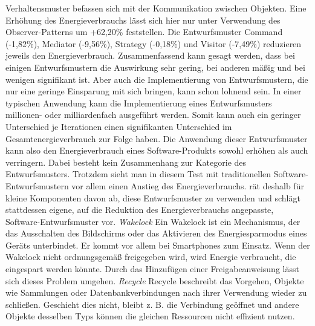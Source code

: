 \documentclass[utf8,biblatex]{lni}
\begin{document}
\newline
Verhaltensmuster befassen sich mit der Kommunikation zwischen Objekten. Eine Erhöhung des Energieverbrauchs lässt sich hier nur unter Verwendung des Observer-Patterns um +62,20\% feststellen. Die Entwurfsmuster Command (-1,82\%), Mediator (-9,56\%), Strategy (-0,18\%) und Visitor (-7,49\%) reduzieren jeweils den Energieverbrauch.
\newline
Zusammenfassend kann gesagt werden, dass bei einigen Entwurfsmustern die Auswirkung sehr gering, bei anderen mäßig und bei wenigen signifikant ist. Aber auch die Implementierung von Entwurfsmustern, die nur eine geringe Einsparung mit sich bringen, kann schon lohnend sein. In einer typischen Anwendung kann die Implementierung eines Entwurfsmusters millionen- oder milliardenfach ausgeführt werden. Somit kann auch ein geringer Unterschied je Iterationen einen signifikanten Unterschied im Gesamtenergieverbrauch zur Folge haben.
Die Anwendung dieser Entwurfsmuster kann also den Energieverbrauch eines Software-Produkts sowohl erhöhen als auch verringern. Dabei besteht kein Zusammenhang zur Kategorie des Entwurfsmusters. \cite{Sahin12}
\newline
\newline
Trotzdem sieht man in diesem Test mit traditionellen Software-Entwurfsmustern vor allem einen Anstieg des Energieverbrauchs. \cite{Calero21} rät deshalb für kleine Komponenten davon ab, diese Entwurfsmuster zu verwenden und schlägt stattdessen eigene, auf die Reduktion des Energieverbrauchs angepasste, Software-Entwurfsmuster vor.
\newline \newline \textit{Wakelock} \newline
Ein Wakelock ist ein Mechanismus, der das Ausschalten des Bildschirms oder das Aktivieren des Energiesparmodus eines Geräts unterbindet. Er kommt vor allem bei Smartphones zum Einsatz. Wenn der Wakelock nicht ordnungsgemäß freigegeben wird, wird Energie verbraucht, die eingespart werden könnte. Durch das Hinzufügen einer Freigabeanweisung lässt sich dieses Problem umgehen. \cite{Calero21}
\newline \newline \textit{Recycle} \newline
Recycle beschreibt das Vorgehen, Objekte wie Sammlungen oder Datenbankverbindungen nach ihrer Verwendung wieder zu schließen. Geschieht dies nicht, bleibt z. B. die Verbindung geöffnet und andere Objekte desselben Typs können die gleichen Ressourcen nicht effizient nutzen. \cite{Calero21}
\end{document}
